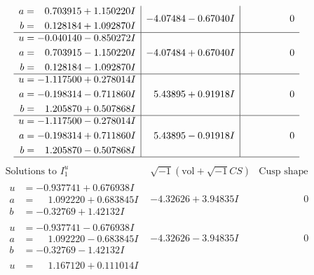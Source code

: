 \documentclass[1p]{elsarticle_modified}
\theoremstyle{definition}
\newcommand{\I}{\sqrt{-1}}
\begin{document}
$$\begin{array}{c|c|c}
\begin{aligned}
a &= \phantom{-}0.703915 + 1.150220 I \\
b &= \phantom{-}0.128184 + 1.092870 I\end{aligned}
 & -4.07484 - 0.67040 I & \phantom{-0.000000 } 0 \\ \hline\begin{aligned}
u &= -0.040140 - 0.850272 I \\
a &= \phantom{-}0.703915 - 1.150220 I \\
b &= \phantom{-}0.128184 - 1.092870 I\end{aligned}
 & -4.07484 + 0.67040 I & \phantom{-0.000000 } 0 \\ \hline\begin{aligned}
u &= -1.117500 + 0.278014 I \\
a &= -0.198314 - 0.711860 I \\
b &= \phantom{-}1.205870 + 0.507868 I\end{aligned}
 & \phantom{-}5.43895 + 0.91918 I & \phantom{-0.000000 } 0 \\ \hline\begin{aligned}
u &= -1.117500 - 0.278014 I \\
a &= -0.198314 + 0.711860 I \\
b &= \phantom{-}1.205870 - 0.507868 I\end{aligned}
 & \phantom{-}5.43895 - 0.91918 I & \phantom{-0.000000 } 0\\
 \hline 
 \end{array}$$\newpage$$\begin{array}{c|c|c}  
\text{Solutions to }I^u_{1}& \I (\text{vol} + \sqrt{-1}CS) & \text{Cusp shape}\\
 \hline 
\begin{aligned}
u &= -0.937741 + 0.676938 I \\
a &= \phantom{-}1.092220 + 0.683845 I \\
b &= -0.32769 + 1.42132 I\end{aligned}
 & -4.32626 + 3.94835 I & \phantom{-0.000000 } 0 \\ \hline\begin{aligned}
u &= -0.937741 - 0.676938 I \\
a &= \phantom{-}1.092220 - 0.683845 I \\
b &= -0.32769 - 1.42132 I\end{aligned}
 & -4.32626 - 3.94835 I & \phantom{-0.000000 } 0 \\ \hline\begin{aligned}
u &= \phantom{-}1.167120 + 0.111014 I \\

\end{aligned}
\end{array}$$
\end{document}
